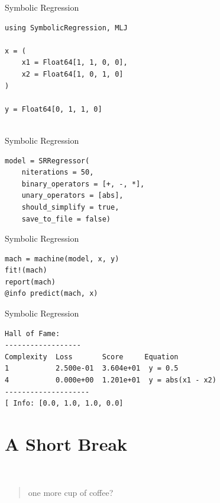 \documentclass[11pt]{beamer}
\begin{document}
\begin{frame}[fragile]{Symbolic Regression}
\begin{lstlisting}
using SymbolicRegression, MLJ

x = (
	x1 = Float64[1, 1, 0, 0], 
	x2 = Float64[1, 0, 1, 0]
)
		
y = Float64[0, 1, 1, 0]
		
\end{lstlisting}
\end{frame}


\begin{frame}[fragile]{Symbolic Regression}
	\begin{lstlisting}
model = SRRegressor(
	niterations = 50,
	binary_operators = [+, -, *],
	unary_operators = [abs],
	should_simplify = true,
	save_to_file = false)

\end{lstlisting}
\end{frame}

\begin{frame}[fragile]{Symbolic Regression}
\begin{lstlisting}
mach = machine(model, x, y)
fit!(mach)
report(mach)
@info predict(mach, x)
\end{lstlisting}
\end{frame}


\begin{frame}[fragile]{Symbolic Regression}
\begin{lstlisting}
Hall of Fame:   
------------------                                                                                                                                    Complexity  Loss       Score     Equation                                                                                                                1           2.500e-01  3.604e+01  y = 0.5                                                                                                                4           0.000e+00  1.201e+01  y = abs(x1 - x2)
--------------------                                                                                                       
[ Info: [0.0, 1.0, 1.0, 0.0]

\end{lstlisting}
\end{frame}

\section{A Short Break}
\begin{frame}[fragile]{}
\begin{center}
\Coffeecup[7] \\
\vspace{1cm}
{\huge
\begin{quotation}
one more cup of coffee?
\end{quotation}
} 
\end{center}
\end{frame}
\end{document}
